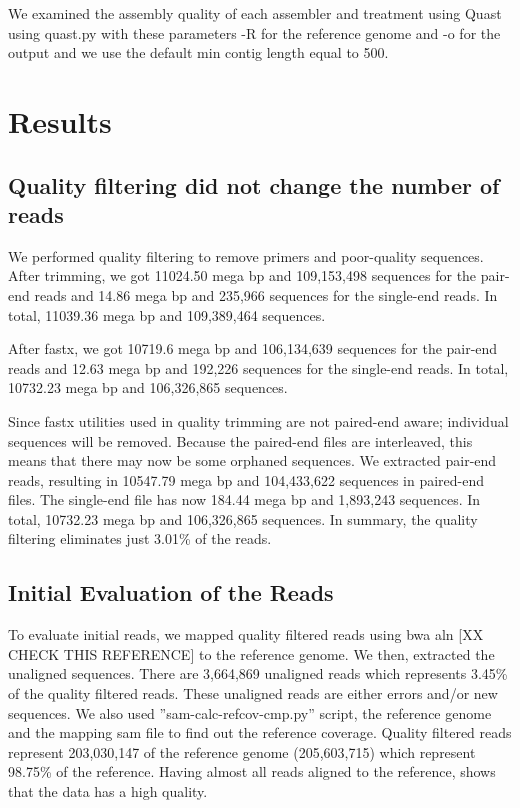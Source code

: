 We examined the assembly quality of each assembler and treatment using Quast \cite{quast} using quast.py  with these parameters -R for the reference genome and -o for the output and we use the default min contig length equal to 500. 



\section*{Results}


\subsection*{Quality filtering did not change the number of reads}            
We performed quality filtering to remove primers and poor-quality sequences. After trimming, we got 11024.50 mega bp and 109,153,498 sequences for the pair-end reads and 14.86 mega bp and 235,966 sequences for the single-end reads. In total,  11039.36 mega bp and 109,389,464 sequences. 


After fastx, we got 10719.6 mega bp and  106,134,639 sequences for the pair-end reads and 12.63  mega bp and  192,226 sequences for the single-end reads. In total, 10732.23 mega bp and 106,326,865 sequences. 

Since fastx utilities used in quality trimming  are not paired-end aware;  individual sequences will be removed. Because the paired-end files are interleaved, this means that there may now be some orphaned sequences. We extracted pair-end reads, resulting in 10547.79 mega bp and 104,433,622 sequences in paired-end files. The single-end file has now 184.44 mega bp and 1,893,243 sequences. In total, 10732.23 mega bp and 106,326,865 sequences.
In summary, the quality filtering eliminates just 3.01\% of the reads. 

\subsection*{Initial Evaluation of the Reads}
To evaluate initial reads, we mapped quality filtered reads using bwa aln \cite{bwa-mem} [XX CHECK THIS REFERENCE] to the reference genome. We then, extracted the unaligned sequences. There are 3,664,869 unaligned reads which represents 3.45\% of the quality filtered reads. These unaligned reads are either errors and/or new sequences.  We also used ”sam-calc-refcov-cmp.py” script, the reference genome and the mapping  sam file to find out the reference coverage. Quality filtered reads  represent 203,030,147  of the reference genome (205,603,715) which represent 98.75\%  of the reference. Having almost all reads aligned to the reference, shows that the data has a high quality. 

